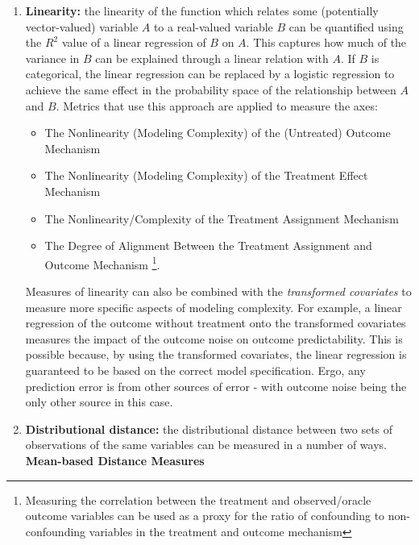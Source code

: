 \documentclass[../main.tex]{subfiles}
\begin{document}
\begin{enumerate}
    \item \textbf{Linearity:} the linearity of the function which relates some (potentially vector-valued) variable $A$ to a real-valued variable $B$ can be quantified using the $R^2$ value of a linear regression of $B$ on $A$. This captures how much of the variance in $B$ can be explained through a linear relation with $A$. If $B$ is categorical, the linear regression can be replaced by a logistic regression to achieve the same effect in the probability space of the relationship between $A$ and $B$. Metrics that use this approach are applied to measure the axes:

    \begin{itemize}
        \item The Nonlinearity (Modeling Complexity) of the (Untreated) Outcome Mechanism
        \item The Nonlinearity (Modeling Complexity) of the Treatment Effect Mechanism
        \item The Nonlinearity/Complexity of the Treatment Assignment Mechanism
        \item The Degree of Alignment Between the Treatment Assignment and Outcome Mechanism \footnote{Measuring the correlation between the treatment and observed/oracle outcome variables can be used as a proxy for the ratio of confounding to non-confounding variables in the treatment and outcome mechanism}.
    \end{itemize}
    
    Measures of linearity can also be combined with the \textit{transformed covariates} to measure more specific aspects of modeling complexity. For example, a linear regression of the outcome without treatment onto the transformed covariates measures the impact of the outcome noise on outcome predictability. This is possible because, by using the transformed covariates, the linear regression is guaranteed to be based on the correct model specification. Ergo, any prediction error is from other sources of error - with outcome noise being the only other source in this case.

    \item \textbf{Distributional distance:} the distributional distance between two sets of observations of the same variables can be measured in a number of ways.
    \vspace{\baselineskip}
    \textbf{Mean-based Distance Measures}

    \begin{itemize}


\end{itemize}
\end{enumerate}
\end{document}
